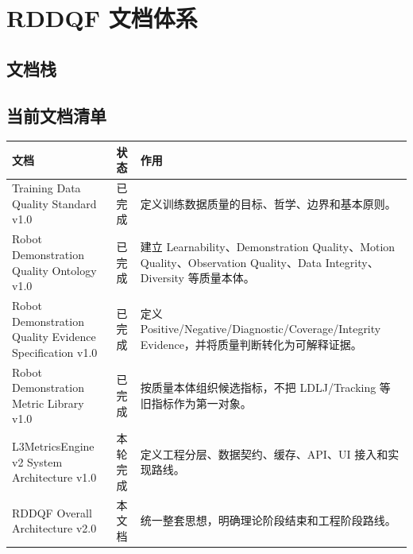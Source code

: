 \documentclass[UTF8,zihao=-4,oneside,openany]{ctexrep}
\begin{document}
\section{RDDQF 文档体系}

\subsection{文档栈}

\begin{center}
\end{center}

\subsection{当前文档清单}

\begin{longtable}{L{4.3cm} L{3cm} L{6.5cm}}
\toprule
文档 & 状态 & 作用 \\
\midrule
Training Data Quality Standard v1.0 & 已完成 & 定义训练数据质量的目标、哲学、边界和基本原则。 \\
Robot Demonstration Quality Ontology v1.0 & 已完成 & 建立 Learnability、Demonstration Quality、Motion Quality、Observation Quality、Data Integrity、Diversity 等质量本体。 \\
Robot Demonstration Quality Evidence Specification v1.0 & 已完成 & 定义 Positive/Negative/Diagnostic/Coverage/Integrity Evidence，并将质量判断转化为可解释证据。 \\
Robot Demonstration Metric Library v1.0 & 已完成 & 按质量本体组织候选指标，不把 LDLJ/Tracking 等旧指标作为第一对象。 \\
L3MetricsEngine v2 System Architecture v1.0 & 本轮完成 & 定义工程分层、数据契约、缓存、API、UI 接入和实现路线。 \\
RDDQF Overall Architecture v2.0 & 本文档 & 统一整套思想，明确理论阶段结束和工程阶段路线。 \\
\bottomrule
\end{longtable}
\end{document}
